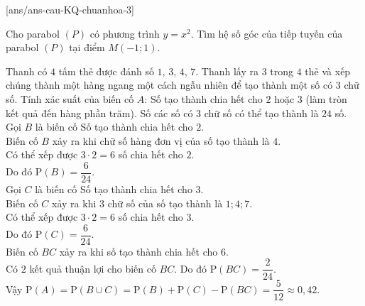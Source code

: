 
\caukq
{}[ans/ans-cau-KQ-chuanhoa-3]

\begin{ex}%
	Cho parabol $(P)$ có phương trình $y=x^2$. Tìm hệ số góc của tiếp tuyến của parabol $(P)$ tại điểm $M(-1;1)$.
\end{ex}
\begin{ex}%
	Thanh có $4$ tấm thẻ được đánh số $1$, $3$, $4$, $7$. Thanh lấy ra $3$ trong $4$ thẻ và xếp chúng thành một hàng ngang một cách ngẫu nhiên để tạo thành một số có $3$ chữ số. Tính xác suất của biến cố $A$: \text{\lq\lq}Số tạo thành chia hết cho $2$ hoặc $3$\text{\rq\rq} (làm tròn kết quả đến hàng phần trăm).
	\loigiai
	{
		Số các số có $3$ chữ số có thể tạo thành là $24$ số.\\
		Gọi $B$ là biến cố \text{\lq\lq}Số tạo thành chia hết cho $2$\text{\rq\rq}.\\
		Biến cố $B$ xảy ra khi chữ số hàng đơn vị của số tạo thành là $4$.\\
		Có thể xếp được $3\cdot 2=6$ số chia hết cho $2$.\\
		Do đó $\mathrm{P}(B)=\dfrac{6}{24}$.\\
		Gọi $C$ là biến cố \text{\lq\lq}Số tạo thành chia hết cho $3$\text{\rq\rq}.\\
		Biến cố $C$ xảy ra khi $3$ chữ số của số tạo thành là $1;4;7$.\\
		Có thể xếp được $3\cdot 2=6$ số chia hết cho $3$.\\
		Do đó $\mathrm{P}(C)=\dfrac{6}{24}$.\\
		Biến cố $BC$ xảy ra khi số tạo thành chia hết cho $6$.\\
		Có $2$ kết quả thuận lợi cho biến cố $BC$. Do đó $\mathrm{P}(BC)=\dfrac{2}{24}$.\\
		Vậy $\mathrm{P}(A)=\mathrm{P}(B\cup C)=\mathrm{P}(B)+\mathrm{P}(C)-\mathrm{P}(BC)=\dfrac{5}{12}\approx 0{,}42$.
	}
\end{ex}

